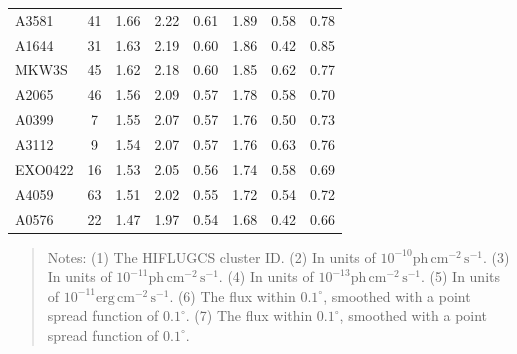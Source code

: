 \documentclass[10pt,aps,pra,reprint,amsmath,amsfonts,amssymb,showpacs,nofootinbib,floatfix]{revtex4-1}
\newcommand{\rmn}{\mathrm}
\begin{document}
\begin{table}
\begin{minipage}{2.0\columnwidth}
\begin{tabular}{l  c c c c c c c}
A3581    &  41 &   1.66 &   2.22 &   0.61 &   1.89 &   0.58 &   0.78 \\
A1644    &  31 &   1.63 &   2.19 &   0.60 &   1.86 &   0.42 &   0.85 \\
MKW3S    &  45 &   1.62 &   2.18 &   0.60 &   1.85 &   0.62 &   0.77 \\
A2065    &  46 &   1.56 &   2.09 &   0.57 &   1.78 &   0.58 &   0.70 \\
A0399    &   7 &   1.55 &   2.07 &   0.57 &   1.76 &   0.50 &   0.73 \\
A3112    &   9 &   1.54 &   2.07 &   0.57 &   1.76 &   0.63 &   0.76 \\
EXO0422  &  16 &   1.53 &   2.05 &   0.56 &   1.74 &   0.58 &   0.69 \\
A4059    &  63 &   1.51 &   2.02 &   0.55 &   1.72 &   0.54 &   0.72 \\
A0576    &  22 &   1.47 &   1.97 &   0.54 &   1.68 &   0.42 &   0.66 \\
\hline
\hline
\end{tabular}
\begin{quote}
  Notes: 
   (1) The HIFLUGCS cluster ID.
   (2) In units of  $10^{-10} \rmn{ph}\,\rmn{cm}^{-2}\,\rmn{s}^{-1}$.
   (3) In units of  $10^{-11} \rmn{ph}\,\rmn{cm}^{-2}\,\rmn{s}^{-1}$.
   (4) In units of  $10^{-13} \rmn{ph}\,\rmn{cm}^{-2}\,\rmn{s}^{-1}$.
   (5) In units of  $10^{-11} \rmn{erg}\,\rmn{cm}^{-2}\,\rmn{s}^{-1}$.
   (6) The flux within $0.1^\circ$, smoothed with a point spread function of $0.1^\circ$. 
   (7) The flux within $0.1^\circ$, smoothed with a point spread function of $0.1^\circ$. 
 \label{tab:flux_tab_CRs}
  \end{quote}
\end{minipage}
\end{table} 
\end{document}
